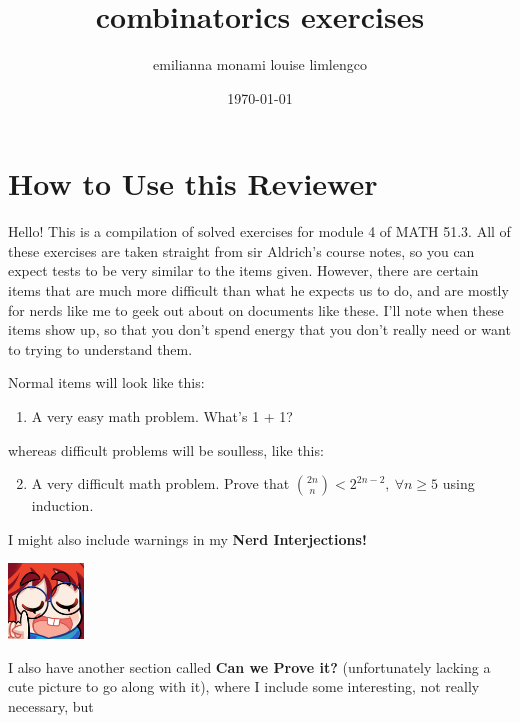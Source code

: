 \documentclass{article}
\title{combinatorics exercises}
\author{emilianna monami louise limlengco}
\date{\today}
\renewcommand{\labelenumi}{\colorbox{pink}{\textbf{\arabic{enumi}}}}
\begin{document}
 

\section*{How to Use this Reviewer}
Hello! This is a compilation of solved exercises for module 4 of MATH 51.3. All of these exercises are taken straight from sir Aldrich's course notes, so you can expect tests 
to be very similar to the items given. However, there are certain items that are much more difficult than what he expects us to do, and are mostly for nerds like me to geek out about 
on documents like these. I'll note when these items show up, so that you don't spend energy that you don't really need or want to trying to understand them.\par Normal items will look like this:\begin{enumerate} 
    \item A very easy math problem. What's 1 + 1?
\end{enumerate} 
whereas difficult problems will be soulless, like this:\begin{enumerate}\setcounter{enumi}{1}
    \renewcommand{\labelenumi}{\fcolorbox{magenta}{white}{\textbf{\arabic{enumi}}}}
    \item A very difficult math problem. Prove that $\displaystyle \binom{2n}{n} < 2^{2n-2},~\forall n \geq 5$ using induction. 
\end{enumerate} I might also include warnings in my \textbf{Nerd Interjections!}\par
\parindent=25pt \begin{minipage}[t]{.14\textwidth}
    \vspace{0pt}
    \includegraphics[width=2cm]{nerd_maddy.png} 
\end{minipage}%
\parindent=0pt \par I also have another section called \textbf{Can we Prove it?} (unfortunately lacking a cute picture to go along with it), where I include some interesting, not really necessary, but 
\end{document}

